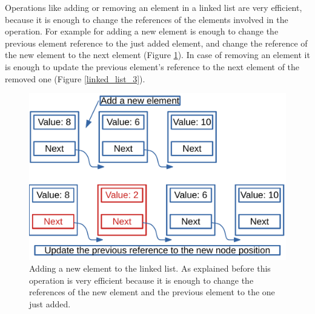 Operations like adding or removing an element in a linked list are very efficient, because it is enough to change the references of the elements involved in the operation. For example for adding a new element is enough to change the previous element reference to the just added element, and change the reference of the new element to the next element (Figure \ref{linked_list_2}). In case of removing an element it is enough to update the previous element's reference to the next element of the removed one (Figure \ref{linked_list_3}). 
\begin{figure}[H]
	\begin{center}
		\includegraphics[scale=.6]{chapters/datastructures/images/linked_list_2.pdf}
		\caption[Adding a new element to a linked list.]{Adding a new element to the linked list. As explained before this operation is very efficient because it is enough to change the references of the new element and the previous element to the one just added.}
		\label{linked_list_2}
	\end{center}
\end{figure}

